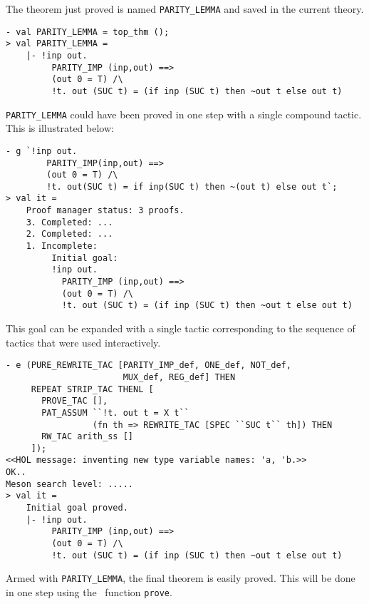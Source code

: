 \noindent The theorem just proved is named
{\small\verb|PARITY_LEMMA|} and saved in the current theory.

\begin{session}
\begin{verbatim}
- val PARITY_LEMMA = top_thm ();
> val PARITY_LEMMA =
    |- !inp out.
         PARITY_IMP (inp,out) ==>
         (out 0 = T) /\
         !t. out (SUC t) = (if inp (SUC t) then ~out t else out t)
\end{verbatim}
\end{session}

{\small\verb|PARITY_LEMMA|} could have been proved in one step with a single
compound tactic. This is illustrated below:

\begin{session}
\begin{verbatim}
- g `!inp out.
        PARITY_IMP(inp,out) ==>
        (out 0 = T) /\
        !t. out(SUC t) = if inp(SUC t) then ~(out t) else out t`;
> val it =
    Proof manager status: 3 proofs.
    3. Completed: ...
    2. Completed: ...
    1. Incomplete:
         Initial goal:
         !inp out.
           PARITY_IMP (inp,out) ==>
           (out 0 = T) /\
           !t. out (SUC t) = (if inp (SUC t) then ~out t else out t)
\end{verbatim}
\end{session}

\noindent This goal can be expanded with a single tactic corresponding to the
sequence of tactics that were used interactively.

\begin{session}
\begin{verbatim}
- e (PURE_REWRITE_TAC [PARITY_IMP_def, ONE_def, NOT_def,
                       MUX_def, REG_def] THEN
     REPEAT STRIP_TAC THENL [
       PROVE_TAC [],
       PAT_ASSUM ``!t. out t = X t``
                 (fn th => REWRITE_TAC [SPEC ``SUC t`` th]) THEN
       RW_TAC arith_ss []
     ]);
<<HOL message: inventing new type variable names: 'a, 'b.>>
OK..
Meson search level: .....
> val it =
    Initial goal proved.
    |- !inp out.
         PARITY_IMP (inp,out) ==>
         (out 0 = T) /\
         !t. out (SUC t) = (if inp (SUC t) then ~out t else out t)
\end{verbatim}
\end{session}

Armed with {\small\verb|PARITY_LEMMA|}, the final theorem is easily
proved.  This will be done in one step using the \ML\ function
{\small\verb|prove|}.

